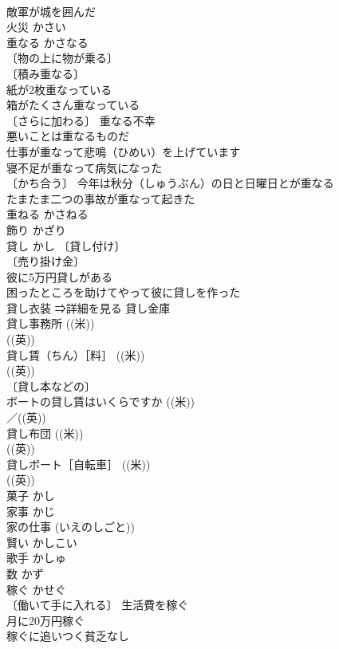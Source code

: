 \documentclass[8pt]{extreport}
\begin{document}
\begin{CJK}{UTF8}{min}
\\	敵軍が城を囲んだ 
\\	火災	かさい	
\\	重なる	かさなる	
\\	〔物の上に物が乗る〕
\\	〔積み重なる〕
\\	紙が2枚重なっている 
\\	箱がたくさん重なっている 
\\	〔さらに加わる〕 重なる不幸 
\\	悪いことは重なるものだ 
\\	仕事が重なって悲鳴（ひめい）を上げています 
\\	寝不足が重なって病気になった 
\\	〔かち合う〕 今年は秋分（しゅうぶん）の日と日曜日とが重なる 
\\	たまたま二つの事故が重なって起きた 
\\	重ねる	かさねる	
\\	飾り	かざり	
\\	貸し	かし	〔貸し付け〕
\\	〔売り掛け金〕
\\	彼に5万円貸しがある 
\\	困ったところを助けてやって彼に貸しを作った 
\\	貸し衣装 ⇒詳細を見る 貸し金庫 
\\	貸し事務所 ((米)) 
\\	((英)) 
\\	貸し賃（ちん）［料］ ((米)) 
\\	((英)) 
\\	〔貸し本などの〕
\\	ボートの貸し賃はいくらですか ((米)) 
\\	／((英)) 
\\	貸し布団 ((米)) 
\\	((英)) 
\\	貸しボート［自転車］ ((米)) 
\\	((英)) 
\\	菓子	かし	
\\	家事	かじ	
\\	家の仕事 (いえのしごと))
\\	賢い	かしこい	
\\	歌手	かしゅ	
\\	数	かず	
\\	稼ぐ	かせぐ	
\\	〔働いて手に入れる〕 生活費を稼ぐ 
\\	月に20万円稼ぐ 
\\	稼ぐに追いつく貧乏なし 

\end{CJK}
\end{document}
